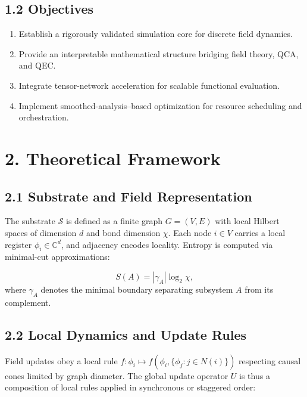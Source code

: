 \documentclass[11pt]{article}
\begin{document}
\subsection*{1.2 Objectives}

\begin{enumerate}
    \item Establish a rigorously validated simulation core for discrete field dynamics.
    \item Provide an interpretable mathematical structure bridging field theory, QCA, and QEC.
    \item Integrate tensor-network acceleration for scalable functional evaluation.
    \item Implement smoothed-analysis–based optimization for resource scheduling and orchestration.
\end{enumerate}

\section{2. Theoretical Framework}

\subsection*{2.1 Substrate and Field Representation}

The substrate \( \mathcal{S} \) is defined as a finite graph \( G = (V, E) \) with local Hilbert spaces of dimension \( d \) and bond dimension \( \chi \). Each node \( i \in V \) carries a local register \( \phi_i \in \mathbb{C}^d \), and adjacency encodes locality. Entropy is computed via minimal-cut approximations:

\[
S(A) = |\gamma_A| \log_2 \chi,
\]
where \( \gamma_A \) denotes the minimal boundary separating subsystem \( A \) from its complement.

\subsection*{2.2 Local Dynamics and Update Rules}

Field updates obey a local rule \( f: \phi_i \mapsto f(\phi_i, \{\phi_j : j \in N(i)\}) \) respecting causal cones limited by graph diameter. The global update operator \( U \) is thus a composition of local rules applied in synchronous or staggered order:
\end{document}
